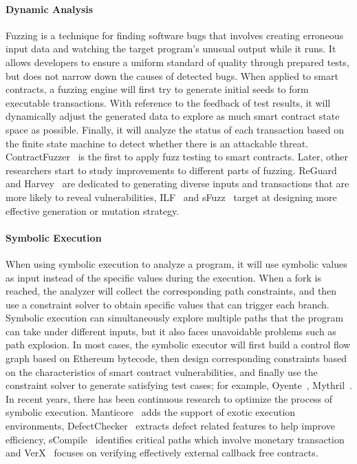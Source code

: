 \paragraph{Dynamic Analysis}
Fuzzing is a technique for finding software bugs that involves creating erroneous input data and watching the target program's unusual output while it runs.
It allows developers to ensure a uniform standard of quality through prepared tests, but does not narrow down the causes of detected bugs.
When applied to smart contracts, a fuzzing engine will first try to generate initial seeds to form executable transactions.
With reference to the feedback of test results, it will dynamically adjust the generated data to explore as much smart contract state space as possible.
Finally, it will analyze the status of each transaction based on the finite state machine to detect whether there is an attackable threat.
ContractFuzzer~\cite{contractfuzzer} is the first to apply fuzz testing to smart contracts. Later, other researchers start to study improvements to different parts of fuzzing.
ReGuard~\cite{liu2018reguard} and Harvey~\cite{wustholz2020harvey} are dedicated to generating diverse inputs and transactions that are more likely to reveal vulnerabilities,
ILF~\cite{he2019learning} and sFuzz~\cite{nguyen2020sfuzz} target at designing more effective generation or mutation strategy.

\paragraph{Symbolic Execution}
When using symbolic execution to analyze a program, it will use symbolic values as input instead of the specific values during the execution.
When a fork is reached, the analyzer will collect the corresponding path constraints, and then use a constraint solver to obtain specific values that can trigger each branch.
Symbolic execution can simultaneously explore multiple paths that the program can take under different inputs, but it also faces unavoidable problems such as path explosion.
In most cases, the symbolic executor will first build a control flow graph based on Ethereum bytecode, then design corresponding constraints based on the characteristics of
smart contract vulnerabilities, and finally use the constraint solver to generate satisfying test cases; for example, Oyente~\cite{oyente}, Mythril~\cite{mythril}.
In recent years, there has been continuous research to optimize the process of symbolic execution.
Manticore~\cite{mossberg2019manticore} adds the support of exotic execution environments, DefectChecker~\cite{chen2021defectchecker} extracts defect related features to help
improve efficiency, sCompile~\cite{chang2019scompile} identifies critical paths which involve monetary transaction and VerX~\cite{permenev2020verx} focuses on verifying
effectively external callback free contracts.

